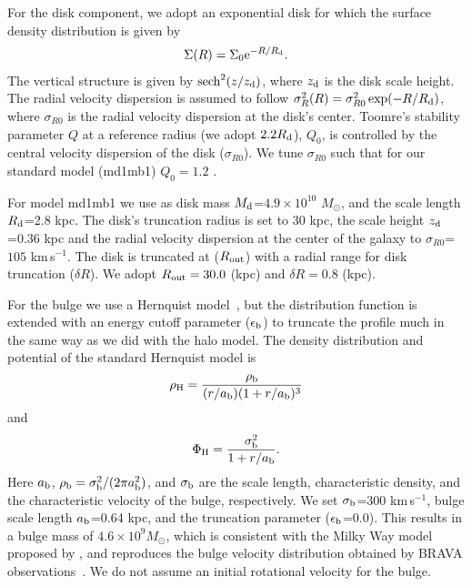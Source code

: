 For the disk component, we adopt an exponential disk for which the surface density
distribution is given by
\begin{eqnarray}
\Sigma (R) = \Sigma_{0} {\rm e}^{-R/R_{\rm d}}.
\end{eqnarray}
The vertical structure is given by ${\rm sech}^2(z/z_{\rm d})$,
where $z_{\rm d}$ is the disk scale height.
The radial velocity dispersion is assumed to follow 
$\sigma_{R}^2(R)=\sigma_{R0}^2\exp(-R/R_{\rm d})$, where 
$\sigma_{R0}$ is the radial velocity dispersion at the disk's center.
Toomre's stability parameter $Q$ 
\citep{1964ApJ...139.1217T,2008gady.book.....B} at
a reference radius (we adopt $2.2R_{\rm d}$), $Q_{0}$, is controlled
by the central velocity dispersion of the disk ($\sigma _{R0}$). 
We tune $\sigma_{R0}$ such that for our standard model (md1mb1) $Q_0=1.2$ .

For model md1mb1 we use as disk mass $M_{\rm d}$=$4.9\times 10^{10}$ $M_{\odot}$,
and the scale length $R_{\rm d}$=2.8 kpc. The disk's truncation radius is set to 30 kpc, the 
scale height $z_{\rm d}$=0.36 kpc and the radial velocity
dispersion at the center of the galaxy to $\sigma_{R0}$=$105$ km\,s$^{-1}$.
The disk is truncated at ($R_{\rm out}$) with a 
radial range for disk truncation ($\delta R$). We adopt 
$R_{\rm out}=30.0$ (kpc) and $\delta R=0.8$ (kpc).

For the bulge we use a Hernquist model~\citep{1990ApJ...356..359H},
but the distribution function is extended with an energy cutoff
parameter ($\epsilon_{\rm b}$) to truncate the profile much in the
same way as we did with the halo model.  The density distribution
and potential of the standard Hernquist model is
\begin{eqnarray}
\rho_{\rm H} = \frac{\rho_{\rm b}}{(r/a_{\rm b})(1+r/a_{\rm b})^3}
\end{eqnarray}
and
\begin{eqnarray}
\Phi_{\rm H} = \frac{\sigma_{\rm b}^2}{1+r/a_{\rm b}}.
\end{eqnarray}
Here $a_{\rm b}$, $\rho_{\rm b}=\sigma_{\rm b}^2/(2\pi a_{\rm b}^2)$, and
$\sigma _{\rm b}$ are the scale length, characteristic density, and
the characteristic velocity of the bulge, respectively.
We set $\sigma_{\rm b}$=300 km\,s$^{-1}$, bulge scale length $a_{\rm b}$=0.64 kpc,
and the truncation parameter ($\epsilon _{\rm b}$=0.0).
This results in a bulge mass of $4.6\times 10^9M_{\odot}$,
which is consistent with the Milky Way model proposed by
\citet{2010ApJ...720L..72S}, and reproduces
the bulge velocity distribution obtained by BRAVA observations~\citep{2012AJ....143...57K}.
We do not assume an initial rotational velocity for the bulge.

